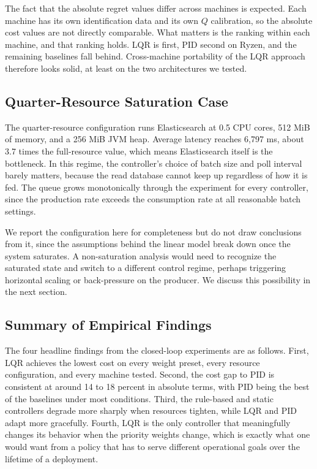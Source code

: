 \documentclass[10pt,a4paper]{article}
\begin{document}
The fact that the absolute regret values differ across machines is expected. Each machine has its own identification data and its own $Q$ calibration, so the absolute cost values are not directly comparable. What matters is the ranking within each machine, and that ranking holds. LQR is first, PID second on Ryzen, and the remaining baselines fall behind. Cross-machine portability of the LQR approach therefore looks solid, at least on the two architectures we tested.

\subsection{Quarter-Resource Saturation Case}

The quarter-resource configuration runs Elasticsearch at 0.5 CPU cores, 512 MiB of memory, and a 256 MiB JVM heap. Average latency reaches 6{,}797 ms, about 3.7 times the full-resource value, which means Elasticsearch itself is the bottleneck. In this regime, the controller's choice of batch size and poll interval barely matters, because the read database cannot keep up regardless of how it is fed. The queue grows monotonically through the experiment for every controller, since the production rate exceeds the consumption rate at all reasonable batch settings.

We report the configuration here for completeness but do not draw conclusions from it, since the assumptions behind the linear model break down once the system saturates. A non-saturation analysis would need to recognize the saturated state and switch to a different control regime, perhaps triggering horizontal scaling or back-pressure on the producer. We discuss this possibility in the next section.

\subsection{Summary of Empirical Findings}

The four headline findings from the closed-loop experiments are as follows. First, LQR achieves the lowest cost on every weight preset, every resource configuration, and every machine tested. Second, the cost gap to PID is consistent at around 14 to 18 percent in absolute terms, with PID being the best of the baselines under most conditions. Third, the rule-based and static controllers degrade more sharply when resources tighten, while LQR and PID adapt more gracefully. Fourth, LQR is the only controller that meaningfully changes its behavior when the priority weights change, which is exactly what one would want from a policy that has to serve different operational goals over the lifetime of a deployment.
\end{document}
